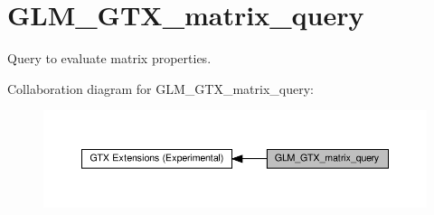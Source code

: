 \hypertarget{group__gtx__matrix__query}{}\section{G\+L\+M\+\_\+\+G\+T\+X\+\_\+matrix\+\_\+query}
\label{group__gtx__matrix__query}


Query to evaluate matrix properties.  


Collaboration diagram for G\+L\+M\+\_\+\+G\+T\+X\+\_\+matrix\+\_\+query\+:\nopagebreak
\begin{figure}[H]
\begin{center}
\leavevmode
\includegraphics[width=350pt]{group__gtx__matrix__query}
\end{center}
\end{figure}
